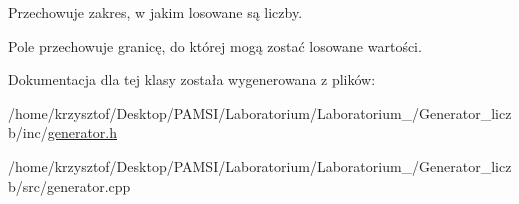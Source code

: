 \-Przechowuje zakres, w jakim losowane są liczby. 

\-Pole przechowuje granicę, do której mogą zostać losowane wartości. 

\-Dokumentacja dla tej klasy została wygenerowana z plików\-:\begin{DoxyCompactItemize}
\item 
/home/krzysztof/\-Desktop/\-P\-A\-M\-S\-I/\-Laboratorium/\-Laboratorium\-\_/\-Generator\-\_\-liczb/inc/\hyperlink{generator_8h}{generator.\-h}\item 
/home/krzysztof/\-Desktop/\-P\-A\-M\-S\-I/\-Laboratorium/\-Laboratorium\-\_/\-Generator\-\_\-liczb/src/generator.\-cpp\end{DoxyCompactItemize}
